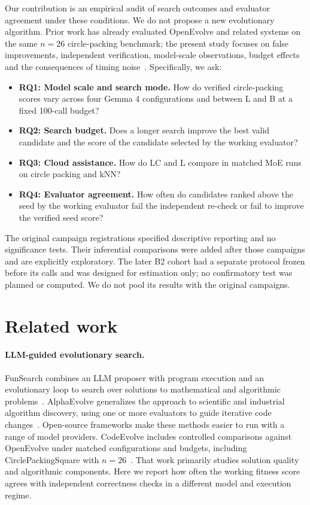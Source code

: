 \documentclass[11pt]{article}
\begin{document}
Our contribution is an empirical audit of search outcomes and evaluator agreement under these conditions. We do not propose a new evolutionary algorithm. Prior work has already evaluated OpenEvolve and related systems on the same $n=26$ circle-packing benchmark; the present study focuses on false improvements, independent verification, model-scale observations, budget effects and the consequences of timing noise~\citep{assumpcao2025codeevolve}. Specifically, we ask:

\begin{itemize}
\item \textbf{RQ1: Model scale and search mode.} How do verified circle-packing scores vary across four Gemma 4 configurations and between L and B at a fixed 100-call budget?
\item \textbf{RQ2: Search budget.} Does a longer search improve the best valid candidate and the score of the candidate selected by the working evaluator?
\item \textbf{RQ3: Cloud assistance.} How do LC and L compare in matched MoE runs on circle packing and kNN?
\item \textbf{RQ4: Evaluator agreement.} How often do candidates ranked above the seed by the working evaluator fail the independent re-check or fail to improve the verified seed score?
\end{itemize}

The original campaign registrations specified descriptive reporting and no significance tests. Their inferential comparisons were added after those campaigns and are explicitly exploratory. The later B2 cohort had a separate protocol frozen before its calls and was designed for estimation only; no confirmatory test was planned or computed. We do not pool its results with the original campaigns.

\section{Related work}\label{sec:related}

\paragraph{LLM-guided evolutionary search.} FunSearch combines an LLM proposer with program execution and an evolutionary loop to search over solutions to mathematical and algorithmic problems~\citep{romera2024funsearch}. AlphaEvolve generalizes the approach to scientific and industrial algorithm discovery, using one or more evaluators to guide iterative code changes~\citep{novikov2025alphaevolve}. Open-source frameworks make these methods easier to run with a range of model providers. CodeEvolve includes controlled comparisons against OpenEvolve under matched configurations and budgets, including CirclePackingSquare with $n=26$~\citep{assumpcao2025codeevolve}. That work primarily studies solution quality and algorithmic components. Here we report how often the working fitness score agrees with independent correctness checks in a different model and execution regime.
\end{document}
